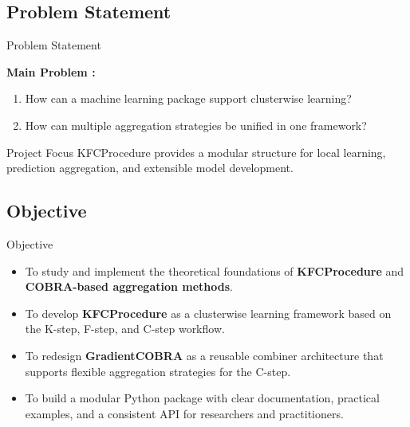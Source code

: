 \subsection{Problem Statement}
\begin{frame}[t]{Problem Statement}
    \small

    \vspace{0.2cm}
    \textbf{Main Problem : }

    \vspace{0.25cm}

    \begin{enumerate}

        \item How can a machine learning package support clusterwise learning?

        \item How can multiple aggregation strategies be unified in one framework?
    \end{enumerate}

    \vspace{0.35cm}
    \begin{block}{Project Focus}
        KFCProcedure provides a modular structure for local learning,
        prediction aggregation, and extensible model development.
    \end{block}
\end{frame}

\subsection{Objective}

\begin{frame}[t]{Objective}
    \footnotesize

    \begin{itemize}
        \setlength\itemsep{0.24cm}

        \item To study and implement the theoretical foundations of
              \textbf{KFCProcedure} and \textbf{COBRA-based aggregation methods}.

        \item To develop \textbf{KFCProcedure} as a clusterwise learning framework
              based on the K-step, F-step, and C-step workflow.

        \item To redesign \textbf{GradientCOBRA} as a reusable combiner architecture
              that supports flexible aggregation strategies for the C-step.

        \item To build a modular Python package with clear documentation, practical examples,
              and a consistent API for researchers and practitioners.
    \end{itemize}

\end{frame}


